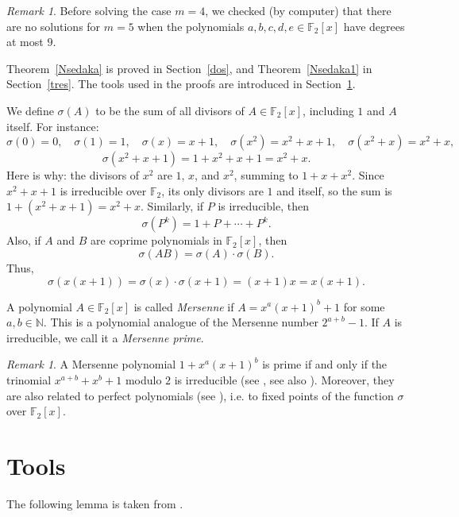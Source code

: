 \documentclass[12pt, reqno]{article}
\theoremstyle{plain}
\theoremstyle{definition}
\theoremstyle{remark}
\newtheorem{remark}[theorem]{Remark}
\def\N{\mathbb{N}}
\def\F{\mathbb{F}}
\begin{document}
\begin{remark}
\label{computs}
Before solving the case $m = 4$, we checked (by computer) that there are no solutions for $m = 5$ when the polynomials $a, b, c, d, e \in \F_2[x]$ have degrees at most $9$.
\end{remark}

Theorem~\ref{Nsedaka} is proved in Section~\ref{dos}, and Theorem~\ref{Nsedaka1} in Section~\ref{tres}. The tools used in the proofs are introduced in Section~\ref{sec:tools}.

We define $\sigma(A)$ to be the sum of all divisors of $A \in \F_2[x]$, including $1$ and $A$ itself. For instance:
\[
\sigma(0) = 0, \quad 
\sigma(1) = 1, \quad 
\sigma(x) = x + 1, \quad 
\sigma(x^2) = x^2 + x + 1, \quad 
\sigma(x^2 + x) = x^2 + x,
\]
\[
\sigma(x^2 + x + 1) = 1 + x^2 + x + 1 = x^2 + x.
\]
Here is why: the divisors of $x^2$ are $1$, $x$, and $x^2$, summing to $1 + x + x^2$. Since $x^2 + x + 1$ is irreducible over $\F_2$, its only divisors are $1$ and itself, so the sum is $1 + (x^2 + x + 1) = x^2 + x$. Similarly, if $P$ is irreducible, then
 $$
 \sigma(P^k) = 1 + P + \cdots + P^k.
 $$ 
 Also, if $A$ and $B$ are coprime polynomials in  $\F_2[x]$, then 
 $$
 \sigma(A B) = \sigma(A) \cdot \sigma(B).
 $$ Thus,
\begin{equation}
\label{perf1}
\sigma(x(x+1)) = \sigma(x) \cdot \sigma(x+1) = (x+1)x = x(x+1).
\end{equation}

A polynomial $A \in \F_2[x]$ is called \emph{Mersenne} if $A = x^a(x+1)^b + 1$ for some $a, b \in \N$. This is a polynomial analogue of the Mersenne number $2^{a+b} - 1$. If $A$ is irreducible, we call it a \emph{Mersenne prime}.



\begin{remark}
\label{Mersennes}
A  Mersenne polynomial $1+x^a(x+1)^b$ is prime if and only if  the trinomial $x^{a+b}+x^b+1$  modulo $2$ is irreducible (see  \cite[Theorem 1.3]{Gall-Rahav8}, see also \cite{BrentLarvalaZ}). Moreover, they are also related to perfect polynomials (see \cite{Gall-Rahav8,Gall-Rahav2020}), i.e. to fixed points of the function $\sigma$ over $\F_2[x]$.
\end{remark}


\section{Tools}
\label{sec:tools}

The following lemma is taken from \cite[Lemma 5]{Canaday}.
\end{document}
